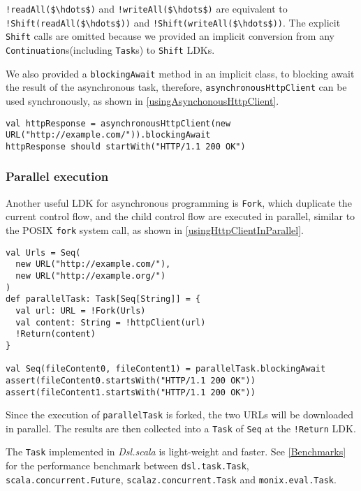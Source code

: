 \lstinline[mathescape=true]{!readAll($\hdots$)} and \lstinline[mathescape=true]{!writeAll($\hdots$)} are equivalent to \lstinline[mathescape=true]{!Shift(readAll($\hdots$))} and \lstinline[mathescape=true]{!Shift(writeAll($\hdots$))}. The explicit \lstinline{Shift} calls are omitted because we provided an implicit conversion from any \lstinline{Continuation}s(including \lstinline{Task}s) to \lstinline{Shift} LDKs.

We also provided a \lstinline{blockingAwait} method in an implicit class, to blocking await the result of the asynchronous task, therefore, \lstinline{asynchronousHttpClient} can be used synchronously, as shown in \cref{usingAsynchonousHttpClient}.

\begin{lstlisting}[caption={Using the example HTTP client},label={usingAsynchonousHttpClient}]
val httpResponse = asynchronousHttpClient(new URL("http://example.com/")).blockingAwait
httpResponse should startWith("HTTP/1.1 200 OK")
\end{lstlisting}

\subsubsection{Parallel execution}\label{Parallel execution}

Another useful LDK for asynchronous programming is \lstinline{Fork}, which duplicate the current control flow, and the child control flow are executed in parallel, similar to the POSIX \lstinline{fork} system call, as shown in \cref{usingHttpClientInParallel}.

\begin{lstlisting}[caption={Using HTTP client in parallel},label={usingHttpClientInParallel}]
val Urls = Seq(
  new URL("http://example.com/"),
  new URL("http://example.org/")
)
def parallelTask: Task[Seq[String]] = {
  val url: URL = !Fork(Urls)
  val content: String = !httpClient(url)
  !Return(content)
}

val Seq(fileContent0, fileContent1) = parallelTask.blockingAwait
assert(fileContent0.startsWith("HTTP/1.1 200 OK"))
assert(fileContent1.startsWith("HTTP/1.1 200 OK"))
\end{lstlisting}

Since the execution of \lstinline{parallelTask} is forked, the two URLs will be downloaded in parallel. The results are then collected into a \lstinline{Task} of \lstinline{Seq} at the \lstinline{!Return} LDK.

The \lstinline{Task} implemented in \textit{Dsl.scala} is light-weight and faster. See \cref{Benchmarks} for the performance benchmark between \lstinline{dsl.task.Task}, \lstinline{scala.concurrent.Future}, \lstinline{scalaz.concurrent.Task} and \lstinline{monix.eval.Task}.

